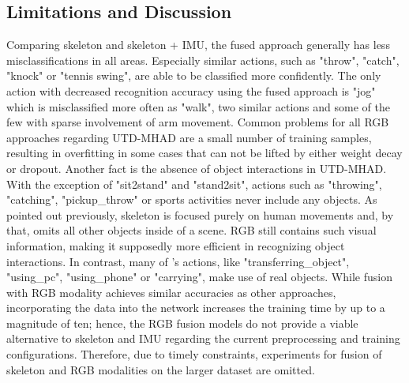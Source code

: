 \subsection{Limitations and Discussion}

Comparing skeleton and skeleton + IMU, the fused approach generally has less misclassifications in all areas. Especially similar actions, such as "throw", "catch", "knock" or "tennis swing", are able to be classified more confidently. The only action with decreased recognition accuracy using the fused approach is "jog" which is misclassified more often as "walk", two similar actions and some of the few with sparse involvement of arm movement.
Common problems for all RGB approaches regarding UTD-MHAD are a small number of training samples, resulting in overfitting in some cases that can not be lifted by either weight decay or dropout. Another fact is the absence of object interactions in UTD-MHAD. With the exception of "sit2stand" and "stand2sit", actions such as "throwing", "catching", "pickup\_throw" or sports activities never include any objects. As pointed out previously, skeleton is focused purely on human movements and, by that, omits all other objects inside of a scene. RGB still contains such visual information, making it supposedly more efficient in recognizing object interactions. In contrast, many of \mmact{}'s actions, like "transferring\_object", "using\_pc", "using\_phone" or "carrying", make use of real objects. While fusion with RGB modality achieves similar accuracies as other approaches, incorporating the data into the network increases the training time by up to a magnitude of ten; hence, the RGB fusion models do not provide a viable alternative to skeleton and IMU regarding the current preprocessing and training configurations.
Therefore, due to timely constraints, experiments for fusion of skeleton and RGB modalities on the larger dataset \mmact{} are omitted.
